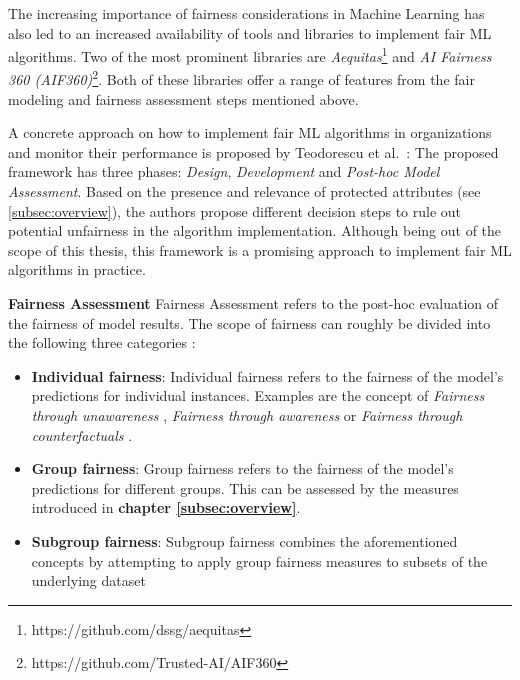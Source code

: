 The increasing importance of fairness considerations in Machine Learning has also led to an increased availability of tools and libraries to implement fair ML algorithms.
Two of the most prominent libraries are \textit{Aequitas}\footnote{https://github.com/dssg/aequitas} and \textit{AI Fairness 360 (AIF360)}\footnote{https://github.com/Trusted-AI/AIF360}.
Both of these libraries offer a range of features from the fair modeling and fairness assessment steps mentioned above.

A concrete approach on how to implement fair ML algorithms in organizations and monitor their performance is proposed by Teodorescu et al.\ \parencite{Teodorescu2020}:
The proposed framework has three phases: \textit{Design}, \textit{Development} and \textit{Post-hoc Model Assessment}. Based on the presence and relevance of protected attributes (see \autoref{subsec:overview}), the authors propose different decision steps to rule out potential unfairness in the algorithm implementation.
Although being out of the scope of this thesis, this framework is a promising approach to implement fair ML algorithms in practice.

\textbf{Fairness Assessment} \newline
Fairness Assessment refers to the post-hoc evaluation of the fairness of model results. The scope of fairness can roughly be divided into the following three categories \parencite{Mehrabi2021}:
\begin{itemize}
    \item \textbf{Individual fairness}: Individual fairness refers to the fairness of the model's predictions for individual instances. Examples are the concept of \textit{Fairness through unawareness} \parencite{Kusner2017},  \textit{Fairness through awareness} \parencite{Dwork2012} or \textit{Fairness through counterfactuals} \parencite{Kusner2017}.
    \item \textbf{Group fairness}: Group fairness refers to the fairness of the model's predictions for different groups. This can be assessed by the measures introduced in \textbf{chapter \ref{subsec:overview}}.
    \item \textbf{Subgroup fairness}: Subgroup fairness combines the aforementioned concepts by attempting to apply group fairness measures to subsets of the underlying dataset \parencite{Kearns2019}
\end{itemize}



